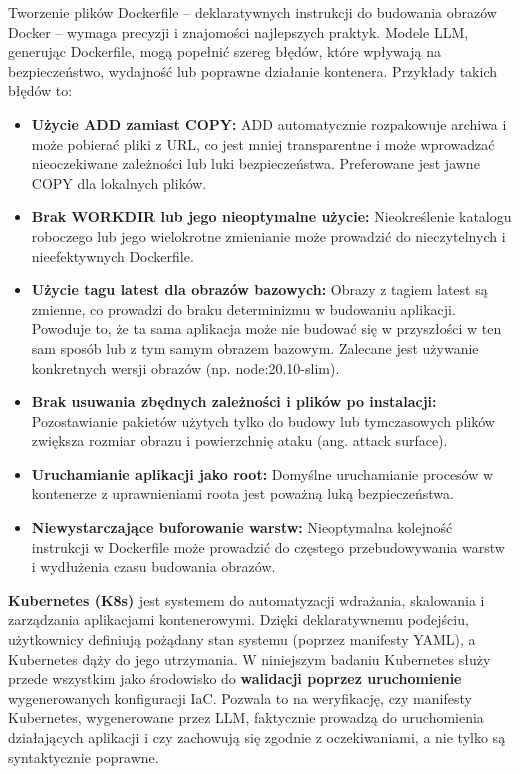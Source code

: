 Tworzenie plików Dockerfile – deklaratywnych instrukcji do budowania obrazów Docker – wymaga precyzji i znajomości najlepszych praktyk. Modele LLM, generując Dockerfile, mogą popełnić szereg błędów, które wpływają na bezpieczeństwo, wydajność lub poprawne działanie kontenera. Przykłady takich błędów to:
\begin{itemize}
\item \textbf{Użycie ADD zamiast COPY:} ADD automatycznie rozpakowuje archiwa i może pobierać pliki z URL, co jest mniej transparentne i może wprowadzać nieoczekiwane zależności lub luki bezpieczeństwa. Preferowane jest jawne COPY dla lokalnych plików.
\item \textbf{Brak WORKDIR lub jego nieoptymalne użycie:} Nieokreślenie katalogu roboczego lub jego wielokrotne zmienianie może prowadzić do nieczytelnych i nieefektywnych Dockerfile.
\item \textbf{Użycie tagu latest dla obrazów bazowych:} Obrazy z tagiem latest są zmienne, co prowadzi do braku determinizmu w budowaniu aplikacji. Powoduje to, że ta sama aplikacja może nie budować się w przyszłości w ten sam sposób lub z tym samym obrazem bazowym. Zalecane jest używanie konkretnych wersji obrazów (np. node:20.10-slim).
\item \textbf{Brak usuwania zbędnych zależności i plików po instalacji:} Pozostawianie pakietów użytych tylko do budowy lub tymczasowych plików zwiększa rozmiar obrazu i powierzchnię ataku (ang. attack surface).
\item \textbf{Uruchamianie aplikacji jako root:} Domyślne uruchamianie procesów w kontenerze z uprawnieniami roota jest poważną luką bezpieczeństwa.
\item \textbf{Niewystarczające buforowanie warstw:} Nieoptymalna kolejność instrukcji w Dockerfile może prowadzić do częstego przebudowywania warstw i wydłużenia czasu budowania obrazów.
\end{itemize}

\textbf{Kubernetes (K8s)} jest systemem do automatyzacji wdrażania, skalowania i zarządzania aplikacjami kontenerowymi. Dzięki deklaratywnemu podejściu, użytkownicy definiują pożądany stan systemu (poprzez manifesty YAML), a Kubernetes dąży do jego utrzymania. W niniejszym badaniu Kubernetes służy przede wszystkim jako środowisko do \textbf{walidacji poprzez uruchomienie} wygenerowanych konfiguracji IaC. Pozwala to na weryfikację, czy manifesty Kubernetes, wygenerowane przez LLM, faktycznie prowadzą do uruchomienia działających aplikacji i czy zachowują się zgodnie z oczekiwaniami, a nie tylko są syntaktycznie poprawne.

